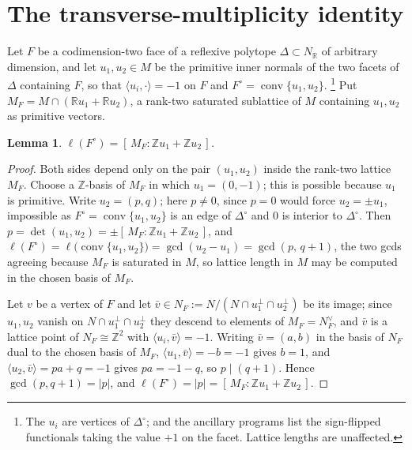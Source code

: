 \documentclass[11pt]{amsart}
\newtheorem{lemma}[theorem]{Lemma}
\theoremstyle{definition}
\theoremstyle{remark}
\newcommand{\ZZ}{\mathbb{Z}}
\newcommand{\RR}{\mathbb{R}}
\newcommand{\NN}{N}
\newcommand{\MM}{M}
\newcommand{\conv}{\operatorname{conv}}
\begin{document}
\section{The transverse-multiplicity identity}\label{sec:mult}

Let $F$ be a codimension-two face of a reflexive polytope
$\Delta \subset \NN_\RR$ of arbitrary dimension, and let
$u_1, u_2 \in \MM$ be the primitive inner
normals of the two facets of $\Delta$ containing $F$, so that
$\langle u_i, \cdot\rangle = -1$ on $F$ and $F^\circ = \conv\{u_1, u_2\}$.
\footnote{The $u_i$ are vertices of $\Delta^\circ$; \cite{paper1} and
the ancillary programs list the sign-flipped functionals taking the value
$+1$ on the facet.  Lattice lengths are unaffected.}
Put $\MM_F = \MM \cap (\RR u_1 + \RR u_2)$, a rank-two saturated sublattice
of $\MM$ containing $u_1, u_2$ as primitive vectors.

\begin{lemma}\label{lem:mult}
$\ell(F^\circ) = [\,\MM_F : \ZZ u_1 + \ZZ u_2\,]$.
\end{lemma}

\begin{proof}
Both sides depend only on the pair $(u_1,u_2)$ inside the rank-two lattice
$\MM_F$.  Choose a $\ZZ$-basis of $\MM_F$ in which $u_1 = (0,-1)$; this is
possible because $u_1$ is primitive.  Write $u_2 = (p,q)$; here $p \neq 0$, since $p = 0$ would force
$u_2 = \pm u_1$, impossible as $F^\circ = \conv\{u_1,u_2\}$ is an edge of
$\Delta^\circ$ and $0$ is interior to $\Delta^\circ$.  Then $p =
\det(u_1,u_2) = \pm[\,\MM_F : \ZZ u_1 + \ZZ u_2\,]$, and $\ell(F^\circ) =
\ell\bigl(\conv\{u_1,u_2\}\bigr) = \gcd(u_2 - u_1) = \gcd(p,\,q+1)$,
the two gcds agreeing because $\MM_F$ is saturated in $\MM$, so lattice
length in $\MM$ may be computed in the chosen basis of $\MM_F$.

Let $v$ be a vertex of $F$ and let $\bar v \in \NN_F := \NN/(\NN \cap
u_1^\perp \cap u_2^\perp)$ be its image; since $u_1,u_2$ vanish on
$\NN \cap u_1^\perp \cap u_2^\perp$ they descend to elements of
$\MM_F = \NN_F^\vee$, and $\bar v$ is a lattice point of $\NN_F \cong \ZZ^2$
with $\langle u_i, \bar v\rangle = -1$.  Writing $\bar v = (a,b)$ in the
basis of $\NN_F$ dual to the chosen basis of $\MM_F$,
$\langle u_1, \bar v\rangle = -b = -1$ gives $b = 1$, and
$\langle u_2, \bar v\rangle = pa + q = -1$ gives $p a = -1-q$, so
$p \mid (q+1)$.  Hence $\gcd(p, q+1) = |p|$, and
$\ell(F^\circ) = |p| = [\,\MM_F : \ZZ u_1 + \ZZ u_2\,]$.
\end{proof}
\end{document}
